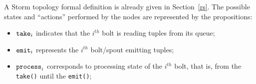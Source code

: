 A Storm topology formal definition is already given in Section~\ref{rs}.
The possible states and ``actions'' performed by the nodes are represented by the propositions:
\begin{itemize}
\item $\mathtt{take}_{i}$ indicates that the $i^{th}$ bolt is reading tuples from its queue;
\item $\mathtt{emit}_{i}$ represents the $ i^{th} $ bolt/spout  emitting tuples;
\item $\mathtt{process}_{i}$ corresponds to processing state of the $i^{th}$ bolt, that is, from the \texttt{take()} until the \texttt{emit()}; 
\end{itemize}


